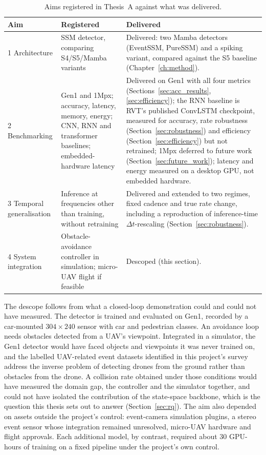 \documentclass[11pt, a4paper]{report}
\begin{document}
\begin{table}[htbp]
\centering
\small
\caption{Aims registered in Thesis~A against what was delivered.}
\label{tab:aims}
\begin{tabularx}{\textwidth}{@{}l>{\raggedright\arraybackslash}X>{\raggedright\arraybackslash}X@{}}
\toprule
\textbf{Aim} & \textbf{Registered} & \textbf{Delivered} \\
\midrule
1 Architecture & SSM detector, comparing S4/S5/Mamba variants &
  Delivered: two Mamba detectors (EventSSM, PureSSM) and a spiking variant, compared against the S5
  baseline (Chapter~\ref{ch:method}). \\
2 Benchmarking & Gen1 and 1Mpx; accuracy, latency, memory, energy; CNN, RNN and transformer baselines;
  embedded-hardware latency &
  Delivered on Gen1 with all four metrics (Sections~\ref{sec:acc_results}, \ref{sec:efficiency}); the
  RNN baseline is RVT's published ConvLSTM checkpoint, measured for accuracy, rate robustness
  (Section~\ref{sec:robustness}) and efficiency (Section~\ref{sec:efficiency}) but not retrained;
  1Mpx deferred to future work (Section~\ref{sec:future_work}); latency and energy measured on a
  desktop GPU, not embedded hardware. \\
3 Temporal generalisation & Inference at frequencies other than training, without retraining &
  Delivered and extended to two regimes, fixed cadence and true rate change, including a reproduction
  of inference-time $\Delta t$-rescaling (Section~\ref{sec:robustness}). \\
4 System integration & Obstacle-avoidance controller in simulation; micro-UAV flight if feasible &
  Descoped (this section). \\
\bottomrule
\end{tabularx}
\end{table}

The descope follows from what a closed-loop demonstration could and could not have measured. The
detector is trained and evaluated on Gen1, recorded by a car-mounted $304\times240$ sensor with car and
pedestrian classes. An avoidance loop needs obstacles detected from a UAV's viewpoint. Integrated in a
simulator, the Gen1 detector would have faced objects and viewpoints it was never trained on, and the
labelled UAV-related event datasets identified in this project's survey address the inverse problem of
detecting drones from the ground rather than obstacles from the drone. A collision rate obtained under
those conditions would have measured the domain gap, the controller and the simulator together, and
could not have isolated the contribution of the state-space backbone, which is the question this thesis
sets out to answer (Section~\ref{sec:rq}). The aim also depended on assets outside the project's
control: event-camera simulation plugins, a stereo event sensor whose integration remained unresolved,
micro-UAV hardware and flight approvals. Each additional model, by contrast, required about 30
GPU-hours of training on a fixed pipeline under the project's own control.
\end{document}
